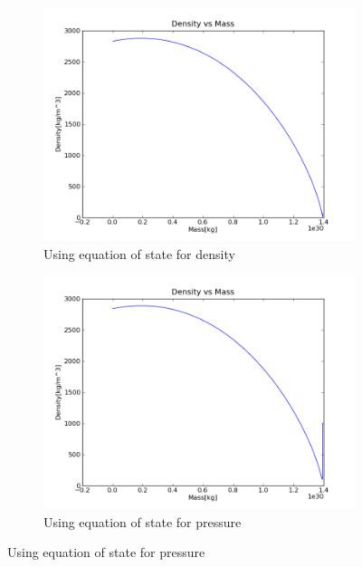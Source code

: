 \documentclass[a4paper,12pt]{article}
\begin{document}
\begin{figure}[H]
    \centering
    \begin{subfigure}{0.49\textwidth}
      \includegraphics[width=\textwidth]{Calculate_density/Density_for_rho_p_t_others_constant}
      \caption{Using equation of state for density}
      \label{fig:Density_density}
    \end{subfigure}
    \begin{subfigure}{0.49\textwidth}
      \includegraphics[width=\textwidth]{Calculate_pressure/Density_for_rho_p_t_others_constant}
      \caption{Using equation of state for pressure}
      \label{fig:Density_pressure}
      \end{subfigure}
\end{figure}
\end{document}
